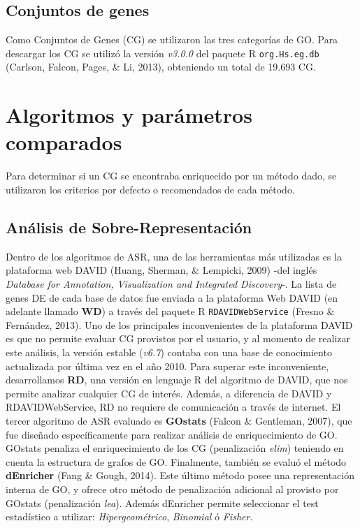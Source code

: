 \documentclass[12pt,twoside]{reedthesis}
\begin{document}
\hypertarget{conjuntos-de-genes}{%
\subsection{Conjuntos de genes}\label{conjuntos-de-genes}}

Como Conjuntos de Genes (CG) se utilizaron las tres categorías de GO. Para descargar los CG se utilizó la versión \emph{v3.0.0} del paquete R \texttt{org.Hs.eg.db} (Carlson, Falcon, Pages, \& Li, 2013), obteniendo un total de 19.693 CG.

\hypertarget{sec:algosComparados}{%
\section{Algoritmos y parámetros comparados}\label{sec:algosComparados}}

Para determinar si un CG se encontraba enriquecido por un método dado, se utilizaron los criterios por defecto o recomendados de cada método.

\hypertarget{analisis-de-sobre-representacion}{%
\subsection{Análisis de Sobre-Representación}\label{analisis-de-sobre-representacion}}

Dentro de los algoritmos de ASR, una de las herramientas más utilizadas es la plataforma web DAVID (Huang, Sherman, \& Lempicki, 2009) -del inglés \emph{Database for Annotation, Visualization and Integrated Discovery}-. La lista de genes DE de cada base de datos fue enviada a la plataforma Web DAVID (en adelante llamado \textbf{WD}) a través del paquete R \texttt{RDAVIDWebService} (Fresno \& Fernández, 2013). Uno de los principales inconvenientes de la plataforma DAVID es que no permite evaluar CG provistos por el usuario, y al momento de realizar este análisis, la versión estable (\emph{v6.7}) contaba con una base de conocimiento actualizada por última vez en el año 2010. Para superar este inconveniente, desarrollamos \textbf{RD}, una versión en lenguaje R del algoritmo de DAVID, que nos permite analizar cualquier CG de interés. Además, a diferencia de DAVID y RDAVIDWebService, RD no requiere de comunicación a través de internet. El tercer algoritmo de ASR evaluado es \textbf{GOstats} (Falcon \& Gentleman, 2007), que fue diseñado específicamente para realizar análisis de enriquecimiento de GO. GOstats penaliza el enriquecimiento de los CG (penalización \emph{elim}) teniendo en cuenta la estructura de grafos de GO. Finalmente, también se evaluó el método \textbf{dEnricher} (Fang \& Gough, 2014). Este último método posee una representación interna de GO, y ofrece otro método de penalización adicional al provisto por GOstats (penalización \emph{lea}). Además dEnricher permite seleccionar el test estadístico a utilizar: \emph{Hipergeométrico}, \emph{Binomial} ó \emph{Fisher}.
\end{document}
